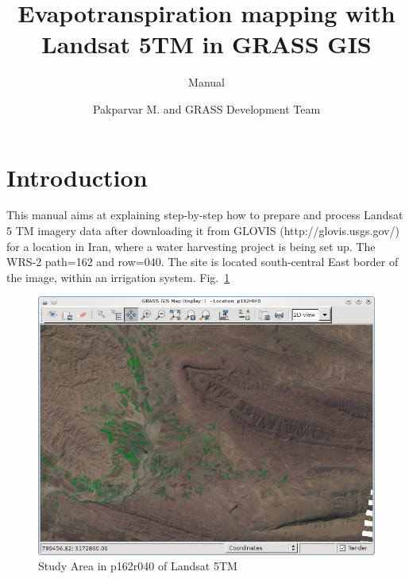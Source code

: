 %


\title{Evapotranspiration mapping with Landsat 5TM in GRASS GIS}
\subtitle{Manual}
\author{Pakparvar M. and GRASS Development Team}

\maketitle

\section{Introduction}

This manual aims at explaining step-by-step how to prepare and process Landsat 5 TM imagery data after downloading it from GLOVIS (http://glovis.usgs.gov/) for a location in Iran, where a water harvesting project is being set up. The WRS-2 path=162 and row=040. The site is located south-central East border of the image, within an irrigation system. Fig.~\ref{fig:gipe000}\newline

\begin{figure}[htbp]
   \centering
   \includegraphics[scale=0.4]{gipe000.png}
   \caption{Study Area in p162r040 of Landsat 5TM}
   \label{fig:gipe000}
\end{figure}


